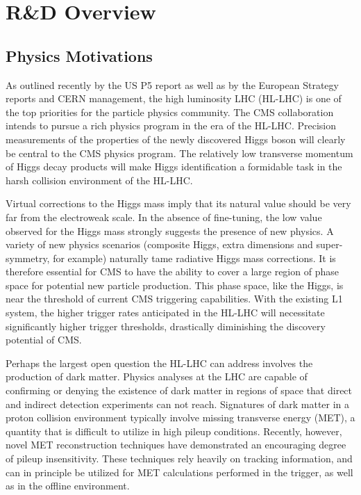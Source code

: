 \section{R\&D Overview}



\subsection{Physics Motivations}

As outlined recently by the US P5 report as well as by the European Strategy reports and CERN management, the high luminosity LHC (HL-LHC) is one of the top priorities for the particle physics community. The CMS collaboration intends to pursue a rich physics program in the era of the HL-LHC. Precision measurements of the properties of the newly discovered Higgs boson will clearly be central to the CMS physics program.  The relatively low transverse momentum of Higgs decay products will make Higgs identification a formidable task in the harsh collision environment of the HL-LHC.

Virtual corrections to the Higgs mass imply that its natural value should be very far from the electroweak scale. In the absence of fine-tuning, the low value observed for the Higgs mass strongly suggests the presence of new physics. A variety of new physics scenarios (composite Higgs, extra dimensions and super-symmetry, for example) naturally tame radiative Higgs mass corrections. It is therefore essential for CMS to have the ability to cover a large region of phase space for potential new particle production. This phase space, like the Higgs, is near the threshold of current CMS triggering capabilities. With the existing L1 system, the higher trigger rates anticipated in the HL-LHC will necessitate significantly higher trigger thresholds, drastically diminishing the discovery potential of CMS.

Perhaps the largest open question the HL-LHC can address involves the production of dark matter. Physics analyses at the LHC are capable of confirming or denying the existence of dark matter in regions of space that direct and indirect detection experiments can not reach. Signatures of dark matter in a proton collision environment typically involve missing transverse energy (MET), a quantity that is difficult to utilize in high pileup conditions.  Recently, however, novel MET reconstruction techniques have demonstrated an encouraging degree of pileup insensitivity.  These techniques rely heavily on tracking information, and can in principle be utilized for MET calculations performed in the trigger, as well as in the offline environment.

